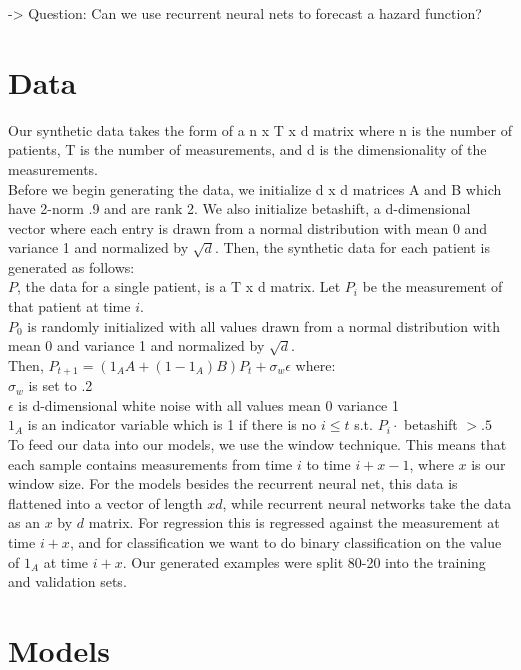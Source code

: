 \documentclass[12pt,a4paper]{article}
\begin{document}
-> Question: Can we use recurrent neural nets to forecast a hazard function?

\section{Data}
Our synthetic data takes the form of a n x T x d matrix where n is the number of patients, T is the number of measurements, and d is the dimensionality of the measurements.  \\

Before we begin generating the data, we initialize d x d matrices A and B which have 2-norm .9 and are rank 2.  We also initialize betashift, a d-dimensional vector where each entry is drawn from a normal distribution with mean 0 and variance 1 and normalized by $\sqrt{d}$.  Then, the synthetic data for each patient is generated as follows:\\

$P$, the data for a single patient, is a T x d matrix.  Let $P_i$ be the measurement of that patient at time $i$.  \\
$P_0$ is randomly initialized with all values drawn from a normal distribution with mean 0 and variance 1 and normalized by $\sqrt{d}$. \\
Then, $P_{t+1} = (1_AA+(1-1_A)B)P_{t} + \sigma_w \epsilon$ where: \\

$\sigma_w$ is set to .2 \\

$\epsilon$ is d-dimensional white noise with all values mean 0 variance 1\\

$1_A$ is an indicator variable which is 1 if there is no $i \leq t$ s.t. $P_i \cdot $ betashift $> .5$\\

To feed our data into our models, we use the window technique.  This means that each sample contains measurements from time $i$ to time $i + x - 1$, where $x$ is our window size.  For the models besides the recurrent neural net, this data is flattened into a vector of length $xd$, while recurrent neural networks take the data as an $x$ by $d$ matrix.  For regression this is regressed against the measurement at time $i + x$, and for classification we want to do binary classification on the value of $1_A$ at time $i + x$.  Our generated examples were split 80-20 into the training and validation sets.  

\section{Models}
\end{document}
